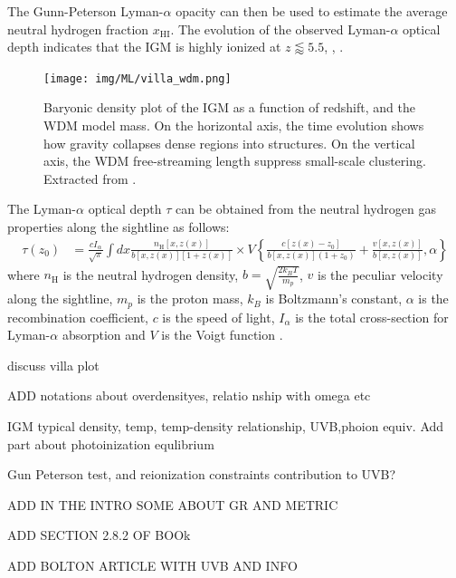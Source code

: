 The Gunn-Peterson Lyman-$\alpha$ opacity can then be used to estimate the average neutral hydrogen fraction $x_\text{HI}$. The evolution of the observed Lyman-$\alpha$ optical depth indicates that the IGM is highly ionized at $z\lessapprox 5.5$, \cite{Becker_2001_GP_trough}, \cite{Ian_model_inde_reio}.

\begin{figure}
    \centering
    \texttt{[image: img/ML/villa\_wdm.png]}
    \caption{Baryonic density plot of the IGM as a function of redshift, and the WDM model mass. On the horizontal axis, the time evolution shows how gravity collapses dense regions into structures. On the vertical axis, the WDM free-streaming length suppress small-scale clustering. Extracted from \cite{Villasenor_2023}.}
    \label{fig:villasenor_wdm}
\end{figure}


The Lyman-$\alpha$ optical depth $\tau$ can be obtained from the neutral hydrogen gas properties along the sightline as follows:
\begin{equation}\label{eq:lyman opacity}
    \begin{aligned}\tau(z_0)&=\frac{cI_\alpha}{\sqrt{\pi}}\int dx\frac{n_{\mathrm{H}}[x,z(x)]}{b[x,z(x)][1+z(x)]}\times V\left\{\frac{c[z(x)-z_0]}{b[x,z(x)](1+z_0)}+\frac{v[x,z(x)]}{b[x,z(x)]},\alpha\right\}\end{aligned}
\end{equation} 
where $n_\text{H}$ is the neutral hydrogen density, $b=\sqrt{\frac{2k_BT}{m_p}}$, $v$ is the peculiar velocity along the sightline, $m_p$ is the proton mass, $k_B$ is Boltzmann's constant, $\alpha$ is the recombination coefficient, $c$ is the speed of light, $I_\alpha$ is the total cross-section for Lyman-$\alpha$ absorption and $V$ is the Voigt function \cite{Choudhury_2001}.




discuss villa plot 

ADD notations about overdensityes, relatio nship with omega etc

IGM typical density, temp, temp-density relationship, UVB,phoion equiv. Add part about photoinization equlibrium

Gun Peterson test, and reionization constraints
contribution to UVB?

ADD IN THE INTRO SOME ABOUT GR AND METRIC

ADD SECTION 2.8.2 OF BOOk

ADD BOLTON ARTICLE WITH UVB AND INFO